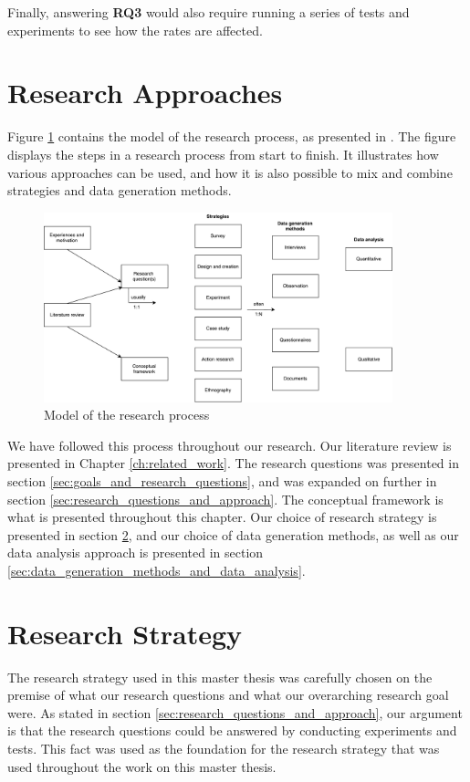 Finally, answering \textbf{RQ3} would also require running a series of tests and experiments to see how the rates are affected.


\section{Research Approaches}
Figure \ref{fig:model_research_process} contains the model of the research process, as presented in \citep{oates2005researching}. The figure displays the steps in a research process from start to finish. It illustrates how various approaches can be used, and how it is also possible to mix and combine strategies and data generation methods.

\begin{figure}[ht]
    \centering
    \includegraphics[width=0.9\textwidth]{fig/methodology/research_strategies.pdf}
    \caption{Model of the research process}
    \label{fig:model_research_process}
\end{figure}

We have followed this process throughout our research. Our literature review is presented in Chapter \ref{ch:related_work}. The research questions was presented in section \ref{sec:goals_and_research_questions}, and was expanded on further in section \ref{sec:research_questions_and_approach}. The conceptual framework is what is presented throughout this chapter. Our choice of research strategy is presented in section \ref{sec:research_strategy}, and our choice of data generation methods, as well as our data analysis approach is presented in section \ref{sec:data_generation_methods_and_data_analysis}.


\section{Research Strategy}
\label{sec:research_strategy}
The research strategy used in this master thesis was carefully chosen on the premise of what our research questions and what our overarching research goal were. As stated in section \ref{sec:research_questions_and_approach}, our argument is that the research questions could be answered by conducting experiments and tests. This fact was used as the foundation for the research strategy that was used throughout the work on this master thesis.

